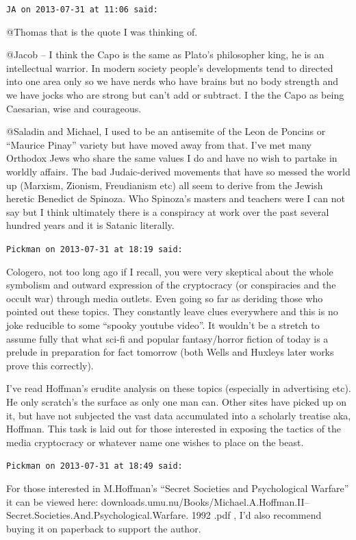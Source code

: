 \begin{footnotesize}
\begin{sffamily}
\texttt{JA on 2013-07-31 at 11:06 said:}

@Thomas that is the quote I was thinking of.

@Jacob -- I think the Capo is the same as Plato's philosopher king, he is an intellectual warrior. In modern society people's developments tend to directed into one area only so we have nerds who have brains but no body strength and we have jocks who are strong but can't add or subtract. I the the Capo as being Caesarian, wise and courageous.

@Saladin and Michael, I used to be an antisemite of the Leon de Poncins or ``Maurice Pinay'' variety but have moved away from that. I've met many Orthodox Jews who share the same values I do and have no wish to partake in worldly affairs. The bad Judaic-derived movements that have so messed the world up (Marxism, Zionism, Freudianism etc) all seem to derive from the Jewish heretic Benedict de Spinoza. Who Spinoza's masters and teachers were I can not say but I think ultimately there is a conspiracy at work over the past several hundred years and it is Satanic literally.

\hfill

\texttt{Pickman on 2013-07-31 at 18:19 said:}

Cologero, not too long ago if I recall, you were very skeptical about the whole symbolism and outward expression of the cryptocracy (or conspiracies and the occult war) through media outlets. Even going so far as deriding those who pointed out these topics. They constantly leave clues everywhere and this is no joke reducible to some ``spooky youtube video''. It wouldn't be a stretch to assume fully that what sci-fi and popular fantasy/horror fiction of today is a prelude in preparation for fact tomorrow (both Wells and Huxleys later works prove this correctly).

I've read Hoffman's erudite analysis on these topics (especially in advertising etc). He only scratch's the surface as only one man can. Other sites have picked up on it, but have not subjected the vast data accumulated into a scholarly treatise aka, Hoffman. This task is laid out for those interested in exposing the tactics of the media cryptocracy or whatever name one wishes to place on the beast.

\hfill

\texttt{Pickman on 2013-07-31 at 18:49 said:}

For those interested in M.Hoffman's ``Secret Societies and Psychological Warfare'' it can be viewed here: downloads.umu.nu/Books/Michael.A.Hoffman.II--Secret.Societies.And.Psychological.Warfare. 1992 .pdf , I'd also recommend buying it on paperback to support the author.


\end{sffamily}
\end{footnotesize}

